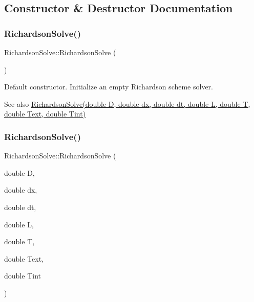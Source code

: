\subsection{Constructor \& Destructor Documentation}
\mbox{\label{class_richardson_solve_a628a7f9104201f63094a49cb9d23b5ca}} 
\subsubsection{\texorpdfstring{Richardson\+Solve()}{RichardsonSolve()}\hspace{0.1cm}{\footnotesize\ttfamily [1/2]}}
{\footnotesize\ttfamily Richardson\+Solve\+::\+Richardson\+Solve (\begin{DoxyParamCaption}{ }\end{DoxyParamCaption})\hspace{0.3cm}{\ttfamily [inline]}}

Default constructor. Initialize an empty Richardson scheme solver. \begin{DoxySeeAlso}{See also}
\hyperlink{class_richardson_solve_a181c71a169292bdba433af2564f763b5}{Richardson\+Solve(double D, double dx, double dt, double L, double T, double Text, double Tint)} 
\end{DoxySeeAlso}
\mbox{\label{class_richardson_solve_a181c71a169292bdba433af2564f763b5}} 
\subsubsection{\texorpdfstring{Richardson\+Solve()}{RichardsonSolve()}\hspace{0.1cm}{\footnotesize\ttfamily [2/2]}}
{\footnotesize\ttfamily Richardson\+Solve\+::\+Richardson\+Solve (\begin{DoxyParamCaption}\item[{double}]{D,  }\item[{double}]{dx,  }\item[{double}]{dt,  }\item[{double}]{L,  }\item[{double}]{T,  }\item[{double}]{Text,  }\item[{double}]{Tint }\end{DoxyParamCaption})\hspace{0.3cm}{\ttfamily [inline]}}

